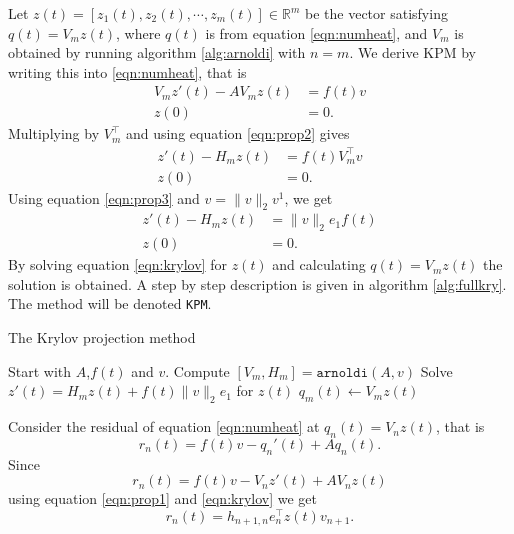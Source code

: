 Let $z(t) = [z_1(t), z_2(t), \cdots, z_m(t)] \in \mathbb{R}^m $ be the vector satisfying $q(t) = V_m z(t)$, where $q(t)$ is from equation \eqref{eqn:numheat}, and $V_m$ is obtained by running algorithm \ref{alg:arnoldi} with $n = m$. 
We derive KPM by writing this into \eqref{eqn:numheat}, that is
\begin{equation*}  \begin{aligned} \label{eqn:KPMtemp1}
V_m z'(t) - A V_m z(t) &= f(t) v \\
z(0)& = 0.
\end{aligned} \end{equation*}
Multiplying by $V_m^{\top}$ and using equation \eqref{eqn:prop2} gives
\begin{equation*} 
\begin{aligned} \label{eqn:KPMtemp2}
z'(t)-H_m z(t) &= f(t) V_m^{\top}  v  \\
z(0)& = 0.
\end{aligned}
\end{equation*}
Using equation \eqref{eqn:prop3} and $v = \|v \|_2 v^1 $, we get
\begin{equation} 
\begin{aligned} \label{eqn:krylov}
z'(t) -H_m z(t) &=  \|v \|_2 e_1 f(t)\\
z(0)& = 0.
\end{aligned}
\end{equation}
By solving equation \eqref{eqn:krylov} for $z(t)$ and calculating $ q(t) = V_m z(t) $ the solution is obtained. A step by step description is given in algorithm \ref{alg:fullkry}. 
The method will be denoted \texttt{KPM}.\\
\begin{algorithm}
\begin{algorithmic} \caption{The Krylov projection method} \label{alg:fullkry} 
\STATE Start with $A$,$f(t)$ and $v$.
\STATE Compute $[V_m ,H_m] = \texttt{arnoldi}(A,v)$
\STATE Solve $  z'(t) = H_m z(t) + f(t) \| v \|_2 e_1  $ for $z(t)$
\STATE $ q_m (t) \leftarrow  V_m z(t) $
\end{algorithmic} 
\end{algorithm}

Consider the residual of equation \eqref{eqn:numheat} at $q_n(t) = V_n z (t)$, that is
\begin{equation*}
r_n(t) = f(t) v - q_n'(t) +Aq_n(t).
\end{equation*}
Since
\begin{equation*}
r_n(t) = f(t)v -V_n z'(t) + A V_n z(t)
\end{equation*}
using equation \eqref{eqn:prop1} and \eqref{eqn:krylov} we get
\begin{equation} \label{eqn:rn}
r_n(t) = h_{n+1,n}e_n^\top z(t) v_{n+1}.
\end{equation}

